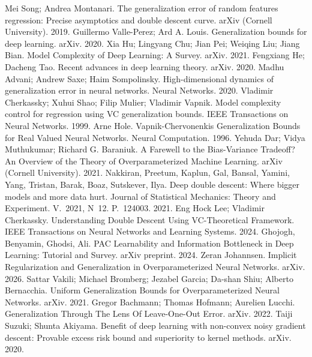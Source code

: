  Mei Song; Andrea Montanari. The generalization error of random features regression: Precise asymptotics and double descent curve. arXiv (Cornell University). 2019.
 Guillermo Valle-Perez; Ard A. Louis. Generalization bounds for deep learning. arXiv. 2020.
 Xia Hu; Lingyang Chu; Jian Pei; Weiqing Liu; Jiang Bian. Model Complexity of Deep Learning: A Survey. arXiv. 2021.
 Fengxiang He; Dacheng Tao. Recent advances in deep learning theory. arXiv. 2020.
 Madhu Advani; Andrew Saxe; Haim Sompolinsky. High-dimensional dynamics of generalization error in neural networks. Neural Networks. 2020.
 Vladimir Cherkassky; Xuhui Shao; Filip Mulier; Vladimir Vapnik. Model complexity control for regression using VC generalization bounds. IEEE Transactions on Neural Networks. 1999.
 Arne Hole. Vapnik-Chervonenkis Generalization Bounds for Real Valued Neural Networks. Neural Computation. 1996.
 Yehuda Dar; Vidya Muthukumar; Richard G. Baraniuk. A Farewell to the Bias-Variance Tradeoff? An Overview of the Theory of Overparameterized Machine Learning. arXiv (Cornell University). 2021.
 Nakkiran, Preetum, Kaplun, Gal, Bansal, Yamini, Yang, Tristan, Barak, Boaz, Sutskever, Ilya. Deep double descent: Where bigger models and more data hurt. Journal of Statistical Mechanics: Theory and Experiment. V.~2021, N~12. P.~124003. 2021.
 Eng Hock Lee; Vladimir Cherkassky. Understanding Double Descent Using VC-Theoretical Framework. IEEE Transactions on Neural Networks and Learning Systems. 2024.
 Ghojogh, Benyamin, Ghodsi, Ali. PAC Learnability and Information Bottleneck in Deep Learning: Tutorial and Survey. arXiv preprint. 2024.
 Zeran Johannsen. Implicit Regularization and Generalization in Overparameterized Neural Networks. arXiv. 2026.
 Sattar Vakili; Michael Bromberg; Jezabel Garcia; Da-shan Shiu; Alberto Bernacchia. Uniform Generalization Bounds for Overparameterized Neural Networks. arXiv. 2021.
 Gregor Bachmann; Thomas Hofmann; Aurelien Lucchi. Generalization Through The Lens Of Leave-One-Out Error. arXiv. 2022.
 Taiji Suzuki; Shunta Akiyama. Benefit of deep learning with non-convex noisy gradient descent: Provable excess risk bound and superiority to kernel methods. arXiv. 2020.
